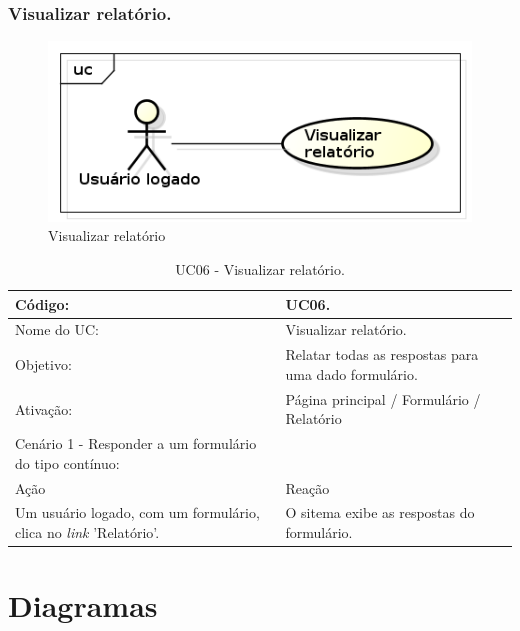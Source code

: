 \documentclass[11pt]{article}
\begin{document}
    \clearpage
      
      \subsubsection{Visualizar relatório.}

        \begin{figure}[h!]
          \centering
          \includegraphics[width=.5\textwidth]{visualizar.png}
          \caption{Visualizar relatório}
        \end{figure}

        \begin{table}[h]
          \begin{center}
            \begin{tabular}{ | p{7cm} | p{8cm} | }
              \hline
              Código: \cellcolor{gray} & UC06. \\
              \hline
              Nome do UC: \cellcolor{gray} & Visualizar relatório. \\
              \hline
              Objetivo: \cellcolor{gray} & Relatar todas as respostas para uma dado formulário. \\
              \hline
              Ativação: \cellcolor{gray} & Página principal / Formulário / Relatório \\
              \hline
              \hline
              Cenário 1 - Responder a um formulário do tipo contínuo: &  \\
              \hline
              Ação\cellcolor{gray} & Reação\cellcolor{gray} \\
              \hline
              Um usuário logado, com um formulário, clica no {\em link} 'Relatório'. & O sitema exibe as respostas do formulário. \\
              \hline
            \end{tabular}
            \caption{UC06 - Visualizar relatório.}
          \end{center}
        \end{table}
        
  \clearpage
      
  \section{Diagramas}
  
\end{document}
